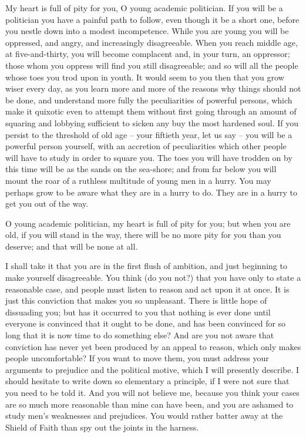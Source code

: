 \documentclass[12pt, oneside, b5paper]{memoir}
\begin{document}
My heart is full of pity for you, O young academic politician. If you will be a politician you have a painful path to follow, even though it be a short one, before you nestle down into a modest incompetence. While you are young you will be oppressed, and angry, and increasingly disagreeable. When you reach middle age, at five-and-thirty, you will become complacent and, in your turn, an oppressor; those whom you oppress will find you still disagreeable; and so will all the people whose toes you trod upon in youth. It would seem to you then that you grow wiser every day, as you learn more and more of the reasons why things should not be done, and understand more fully the peculiarities of powerful persons, which make it quixotic even to attempt them without first going through an amount of squaring and lobbying sufficient to sicken any buy the most hardened soul. If you persist to the threshold of old age -- your fiftieth year, let us say -- you will be a powerful person yourself, with an accretion of peculiarities which other people will have to study in order to square you. The toes you will have trodden on by this time will be as the sands on the sea-shore; and from far below you will mount the roar of a ruthless multitude of young men in a hurry. You may perhaps grow to be aware what they are in a hurry to do. They are in a hurry to get you out of the way.

O young academic politician, my heart is full of pity for you; but when you are old, if you will stand in the way, there will be no more pity for you than you deserve; and that will be none at all.

I shall take it that you are in the first flush of ambition, and just beginning to make yourself disagreeable. You think (do you not?) that you have only to state a reasonable case, and people must listen to reason and act upon it at once. It is just this conviction that makes you so unpleasant. There is little hope of dissuading you; but has it occurred to you that nothing is ever done until everyone is convinced that it ought to be done, and has been convinced for so long that it is now time to do something else? And are you not aware that conviction has never yet been produced by an appeal to reason, which only makes people uncomfortable? If you want to move them, you must address your arguments to prejudice and the political motive, which I will presently describe. I should hesitate to write down so elementary a principle, if I were not sure that you need to be told it. And you will not believe me, because you think your cases are so much more reasonable than mine can have been, and you are ashamed to study men's weaknesses and prejudices. You would rather batter away at the Shield of Faith than spy out the joints in the harness.
\end{document}
